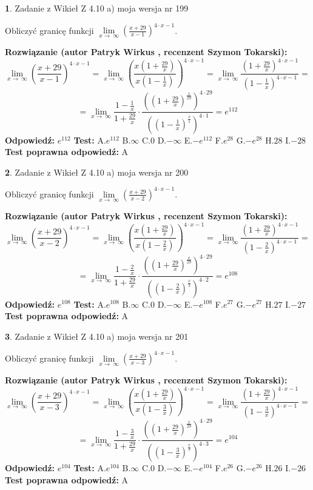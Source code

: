 \documentclass[12pt, a4paper]{article}
\theoremstyle{definition} %
\newtheorem{zad}{}
\newcommand{\zadStart}[1]{\begin{zad}#1\newline}
\newcommand{\zadStop}{\end{zad}}
\newcommand{\rozwStart}[2]{\noindent \textbf{Rozwiązanie (autor #1 , recenzent #2): }\newline}
\newcommand{\rozwStop}{\newline}
\newcommand{\odpStart}{\noindent \textbf{Odpowiedź:}\newline}
\newcommand{\odpStop}{\newline}
\newcommand{\testStart}{\noindent \textbf{Test:}\newline}
\newcommand{\testStop}{\newline}
\newcommand{\kluczStart}{\noindent \textbf{Test poprawna odpowiedź:}\newline}
\newcommand{\kluczStop}{\newline}
\begin{document}
\zadStart{Zadanie z Wikieł Z 4.10 a) moja wersja nr 199}

Obliczyć granicę funkcji  $\lim\limits_{x\to\ \infty}(\frac{x+29}{x-1})^{4\cdot x-1}$.
\zadStop
\rozwStart{Patryk Wirkus}{Szymon Tokarski}
$$\lim\limits_{x\to\ \infty}(\frac{x+29}{x-1})^{4\cdot x-1} = \lim\limits_{x\to\ \infty}(\frac{x(1+\frac{29}{x})}{x(1-\frac{1}{x})})^{4\cdot x-1}=\lim\limits_{x\to\ \infty}\frac{(1+\frac{29}{x})^{4\cdot x-1}}{(1-\frac{1}{x})^{4\cdot x-1}}=$$
$$=\lim\limits_{x\to\ \infty}\frac{1-\frac{1}{x}}{1+\frac{29}{x}}\cdot\frac{((1+\frac{29}{x})^{\frac{x}{29}})^{4\cdot29}}{((1-\frac{1}{x})^{\frac{x}{1}})^{4\cdot1}}=e^{112}$$
\rozwStop
\odpStart
$e^{112}$
\odpStop
\testStart
A.$e^{112}$ B.$\infty$ C.$0$ D.$-\infty$ E.$-e^{112}$
F.$e^{28}$ G.$-e^{28}$
H.$28$
I.$-28$
\testStop
\kluczStart
A
\kluczStop



\zadStart{Zadanie z Wikieł Z 4.10 a) moja wersja nr 200}

Obliczyć granicę funkcji  $\lim\limits_{x\to\ \infty}(\frac{x+29}{x-2})^{4\cdot x-1}$.
\zadStop
\rozwStart{Patryk Wirkus}{Szymon Tokarski}
$$\lim\limits_{x\to\ \infty}(\frac{x+29}{x-2})^{4\cdot x-1} = \lim\limits_{x\to\ \infty}(\frac{x(1+\frac{29}{x})}{x(1-\frac{2}{x})})^{4\cdot x-1}=\lim\limits_{x\to\ \infty}\frac{(1+\frac{29}{x})^{4\cdot x-1}}{(1-\frac{2}{x})^{4\cdot x-1}}=$$
$$=\lim\limits_{x\to\ \infty}\frac{1-\frac{2}{x}}{1+\frac{29}{x}}\cdot\frac{((1+\frac{29}{x})^{\frac{x}{29}})^{4\cdot29}}{((1-\frac{2}{x})^{\frac{x}{2}})^{4\cdot2}}=e^{108}$$
\rozwStop
\odpStart
$e^{108}$
\odpStop
\testStart
A.$e^{108}$ B.$\infty$ C.$0$ D.$-\infty$ E.$-e^{108}$
F.$e^{27}$ G.$-e^{27}$
H.$27$
I.$-27$
\testStop
\kluczStart
A
\kluczStop



\zadStart{Zadanie z Wikieł Z 4.10 a) moja wersja nr 201}

Obliczyć granicę funkcji  $\lim\limits_{x\to\ \infty}(\frac{x+29}{x-3})^{4\cdot x-1}$.
\zadStop
\rozwStart{Patryk Wirkus}{Szymon Tokarski}
$$\lim\limits_{x\to\ \infty}(\frac{x+29}{x-3})^{4\cdot x-1} = \lim\limits_{x\to\ \infty}(\frac{x(1+\frac{29}{x})}{x(1-\frac{3}{x})})^{4\cdot x-1}=\lim\limits_{x\to\ \infty}\frac{(1+\frac{29}{x})^{4\cdot x-1}}{(1-\frac{3}{x})^{4\cdot x-1}}=$$
$$=\lim\limits_{x\to\ \infty}\frac{1-\frac{3}{x}}{1+\frac{29}{x}}\cdot\frac{((1+\frac{29}{x})^{\frac{x}{29}})^{4\cdot29}}{((1-\frac{3}{x})^{\frac{x}{3}})^{4\cdot3}}=e^{104}$$
\rozwStop
\odpStart
$e^{104}$
\odpStop
\testStart
A.$e^{104}$ B.$\infty$ C.$0$ D.$-\infty$ E.$-e^{104}$
F.$e^{26}$ G.$-e^{26}$
H.$26$
I.$-26$
\testStop
\kluczStart
A
\kluczStop
\end{document}
